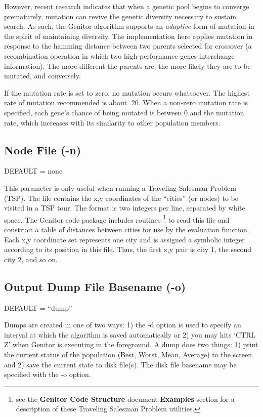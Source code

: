 However, recent research indicates that when a genetic pool begins to converge 
prematurely, mutation can revive the genetic diversity necessary to sustain search. 
As such, the Genitor algorithm supports an {\it adaptive} form of mutation in the spirit 
of maintaining diversity.  The implementation here applies mutation in response to the 
hamming distance between two parents selected for crossover (a recombination operation 
in which two high-performance genes interchange information).  The more different
the parents are, the more likely they are to be mutated, and conversely.

If the mutation rate is set to zero, no mutation occurs whatsoever.  The highest
rate of mutation recommended is about .20.  When a non-zero mutation rate is 
specified, each gene's chance of being mutated is between 0 and the mutation rate,
which increases with its similarity to other population members.

\subsection*{Node File (-n)}
DEFAULT = none

This parameter is only useful when running a Traveling Salesman Problem (TSP).
The file contains the x,y coordinates of the ``cities'' (or nodes) to
be visited in a TSP tour.  The format is two integers per line, separated by
white space.  The Genitor code package includes routines 
\footnote{see the {\bf Genitor Code Structure} document {\bf Examples} section
for a description of these Traveling Salesman Problem utilities.}
to read this file and construct a table of distances between cities for use 
by the evaluation function.  Each x,y coordinate set represents one city and
is assigned a symbolic integer according to its position in this file.  Thus,
the first x,y pair is city 1, the second city 2, and so on.

\subsection*{Output Dump File Basename (-o)}
DEFAULT = ``dump''

Dumps are created in one of two ways:  1) the -d option is used to specify
an interval at which the algorithm is saved automatically or 2) you may
hits `CTRL Z' when Genitor is executing in the foreground.  A dump does
two things: 1) print the current status of the population 
(Best, Worst, Mean, Average) to the screen and 2) save the current state
to disk file(s).  The disk file basename may be specified with the -o 
option.

